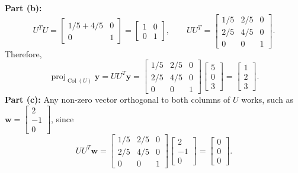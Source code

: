 \documentclass[11pt, letterpaper]{article}
\theoremstyle{definition}
\theoremstyle{remark}
\begin{document}
\textbf{Part (b):}
\[
U^T U = \begin{bmatrix} 1/5 + 4/5 & 0 \\ 0 & 1 \end{bmatrix} = \begin{bmatrix} 1 & 0 \\ 0 & 1 \end{bmatrix}, \qquad UU^T = \begin{bmatrix} 1/5 & 2/5 & 0 \\ 2/5 & 4/5 & 0 \\ 0 & 0 & 1 \end{bmatrix}.
\]
Therefore,
\[
\operatorname{proj}_{\operatorname{Col}(U)} \mathbf{y} = UU^T\mathbf{y} = \begin{bmatrix} 1/5 & 2/5 & 0 \\ 2/5 & 4/5 & 0 \\ 0 & 0 & 1 \end{bmatrix}\begin{bmatrix} 5 \\ 0 \\ 3 \end{bmatrix} = \begin{bmatrix} 1 \\ 2 \\ 3 \end{bmatrix}.
\]
\textbf{Part (c):} Any non-zero vector orthogonal to both columns of $U$ works, such as $\mathbf{w} = \begin{bmatrix} 2 \\ -1 \\ 0 \end{bmatrix}$, since
\[
UU^T\mathbf{w} = \begin{bmatrix} 1/5 & 2/5 & 0 \\ 2/5 & 4/5 & 0 \\ 0 & 0 & 1 \end{bmatrix}\begin{bmatrix} 2 \\ -1 \\ 0 \end{bmatrix} = \begin{bmatrix} 0 \\ 0 \\ 0 \end{bmatrix}.
\]
\end{document}
